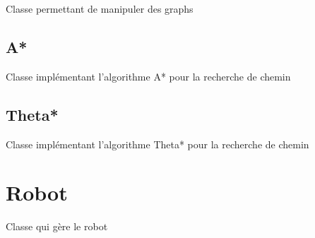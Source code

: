 \documentclass[letterpaper,10pt,french]{sphinxmanual}
\begin{document}
\begin{fulllineitems}
\label{recherche_chemin:lib.recherche_chemin.graph.Graph}
Classe permettant de manipuler des graphs

\end{fulllineitems}



\section{A*}
\label{recherche_chemin:a}\label{recherche_chemin:module-lib.recherche_chemin.astar}

\begin{fulllineitems}
\label{recherche_chemin:lib.recherche_chemin.astar.Astar}
Classe implémentant l'algorithme A* pour la recherche de chemin

\end{fulllineitems}



\section{Theta*}
\label{recherche_chemin:theta}\label{recherche_chemin:module-lib.recherche_chemin.thetastar}

\begin{fulllineitems}
\label{recherche_chemin:lib.recherche_chemin.thetastar.Thetastar}
Classe implémentant l'algorithme Theta* pour la recherche de chemin

\end{fulllineitems}



\chapter{Robot}
\label{robot:module-lib.robot}\label{robot::doc}\label{robot:robot}

\begin{fulllineitems}
\label{robot:lib.robot.Robot}
Classe qui gère le robot

\end{fulllineitems}
\end{document}
